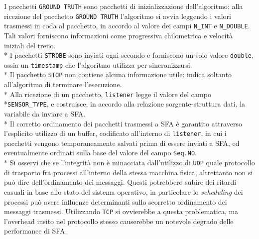 I pacchetti \texttt{GROUND TRUTH} sono pacchetti di inizializzazione dell'algoritmo: alla ricezione del pacchetto \texttt{GROUND TRUTH} l'algoritmo si avvia leggendo i valori trasmessi in coda al pacchetto, in accordo al valore dei campi \texttt{N\_INT} e \texttt{N\_DOUBLE}. Tali valori forniscono informazioni come progressiva chilometrica e velocit\`a iniziali del treno.\\*
I pacchetti \texttt{STROBE} sono inviati ogni secondo e forniscono un solo valore \texttt{double}, ossia un \texttt{timestamp} che l'algoritmo utilizza per sincronizzarsi.\\*
Il pacchetto \texttt{STOP} non contiene alcuna informazione utile: indica soltanto all'algoritmo di terminare l'esecuzione.\\*
Alla ricezione di un pacchetto, \texttt{listener} legge il valore del campo\\*\texttt{SENSOR\_TYPE}, e costruisce, in accordo alla relazione sorgente-struttura dati, la variabile da inviare a SFA.\\*
Il corretto ordinamento dei pacchetti trasmessi a SFA \`e garantito attraverso l'esplicito utilizzo di un buffer, codificato all'interno di \texttt{listener}, in cui i pacchetti vengono temporaneamente salvati prima di essere inviati a SFA, ed eventualmente ordinati sulla base del valore del campo \texttt{Seq.NO}.\\*
Si osservi che se l'integrit\`a non \`e minacciata dall'utilizzo di \texttt{UDP} quale protocollo di trasporto fra processi all'interno della stessa macchina fisica, altrettanto non si pu\`o dire dell'ordinamento dei messaggi. Questi potrebbero subire dei ritardi casuali in base allo stato del sistema operativo, in particolare lo \emph{scheduling} dei processi pu\`o avere influenze determinanti sullo scorretto ordinamento dei messaggi trasmessi. Utilizzando \texttt{TCP} si ovvierebbe a questa problematica, ma l'overhead insito nel protocollo stesso causerebbe un notevole degrado delle performance di SFA.
